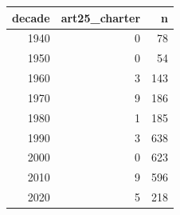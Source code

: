 \begin{tabular}{rrr}
\toprule
decade & art25_charter & n \\
\midrule
1940 & 0 & 78 \\
1950 & 0 & 54 \\
1960 & 3 & 143 \\
1970 & 9 & 186 \\
1980 & 1 & 185 \\
1990 & 3 & 638 \\
2000 & 0 & 623 \\
2010 & 9 & 596 \\
2020 & 5 & 218 \\
\bottomrule
\end{tabular}
